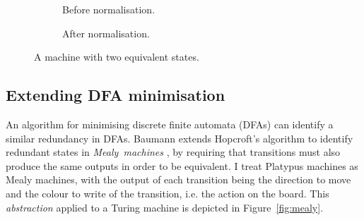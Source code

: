 \begin{figure}
  \begin{subfigure}[b]{0.5\textwidth}
    \begin{center}
    \end{center}
    \caption{Before normalisation.}
    \label{fig:equivalent-states}
  \end{subfigure}
  \begin{subfigure}[b]{0.5\textwidth}
    \begin{center}
    \end{center}
    \caption{After normalisation.}
    \label{fig:normalised-states}
  \end{subfigure}
  \caption{A machine with two equivalent states.}
\end{figure}

\subsection{Extending DFA minimisation}

An algorithm for minimising discrete finite automata (DFAs) can
identify a similar redundancy in DFAs. Baumann
\cite{baumann} extends Hopcroft's algorithm \cite{hopcroft} to identify
redundant states in \emph{Mealy~machines} \cite{mealy}, by requiring
that transitions must also produce the same outputs in order to be
equivalent. I treat Platypus machines as Mealy machines, with the
output of each transition being the direction to move and the colour
to write of the transition, i.e. the action on the board. This \emph{abstraction}
applied to a Turing machine is depicted in Figure~\ref{fig:mealy}.

